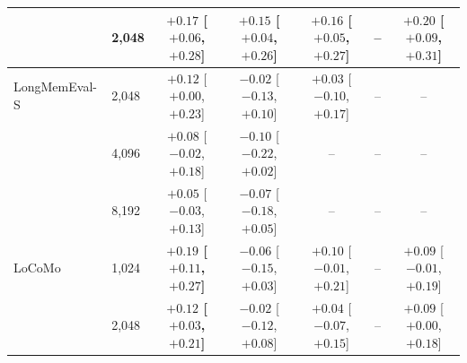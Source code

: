 \begin{tabular}{llccccc}
 & 2,048 & \textbf{$+0.17$ \scriptsize[$+0.06$, $+0.28$]} & \textbf{$+0.15$ \scriptsize[$+0.04$, $+0.26$]} & \textbf{$+0.16$ \scriptsize[$+0.05$, $+0.27$]} & -- & \textbf{$+0.20$ \scriptsize[$+0.09$, $+0.31$]} \\
\midrule
LongMemEval-S & 2,048 & $+0.12$ \scriptsize[$+0.00$, $+0.23$] & $-0.02$ \scriptsize[$-0.13$, $+0.10$] & $+0.03$ \scriptsize[$-0.10$, $+0.17$] & -- & -- \\
 & 4,096 & $+0.08$ \scriptsize[$-0.02$, $+0.18$] & $-0.10$ \scriptsize[$-0.22$, $+0.02$] & -- & -- & -- \\
 & 8,192 & $+0.05$ \scriptsize[$-0.03$, $+0.13$] & $-0.07$ \scriptsize[$-0.18$, $+0.05$] & -- & -- & -- \\
\midrule
LoCoMo & 1,024 & \textbf{$+0.19$ \scriptsize[$+0.11$, $+0.27$]} & $-0.06$ \scriptsize[$-0.15$, $+0.03$] & $+0.10$ \scriptsize[$-0.01$, $+0.21$] & -- & $+0.09$ \scriptsize[$-0.01$, $+0.19$] \\
 & 2,048 & \textbf{$+0.12$ \scriptsize[$+0.03$, $+0.21$]} & $-0.02$ \scriptsize[$-0.12$, $+0.08$] & $+0.04$ \scriptsize[$-0.07$, $+0.15$] & -- & $+0.09$ \scriptsize[$+0.00$, $+0.18$] \\
\bottomrule
\end{tabular}
